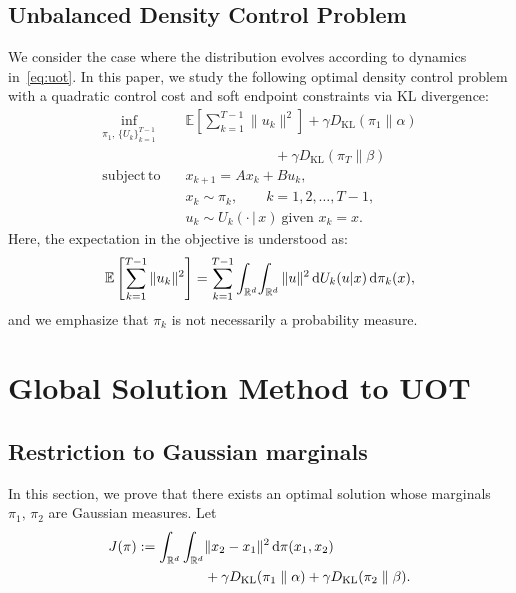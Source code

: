 \documentclass{ifacconf}
\newcommand{\R}{{\mathbb R}}
\newcommand{\exb}[1]{{\mathbb E}\left[ #1 \right]}   %
\newcommand{\rmd}{{\rm d}}
\newcommand{\Rd}{\R ^{d}}
\newcommand{\KL}[2]{D_{\mathrm{KL}}(#1 \parallel #2)}
\newcommand{\subj}{\mathrm{subject \,to}}
\begin{document}
\subsection{Unbalanced Density Control Problem}\label{subsection:udc}
 We consider the case where the distribution evolves according to dynamics in~\eqref{eq:uot}.
In this paper, we study the following optimal density control problem with a quadratic control cost and soft endpoint constraints via KL divergence:
\begin{equation}\label{eq:udc}
    \begin{aligned}
        \inf_{\pi_1,\,\{U_k\}_{k=1}^{T-1}} \quad &\exb{\sum_{k=1}^{T-1}\|u_k\|^2} + \gamma \KL{\pi_1}{\alpha} \\
        & \qquad\qquad\qquad\,\,+ \gamma \KL{\pi_T}{\beta}\\
        \subj\quad & x_{k+1} = A x_k + B u_k,\\
        & x_k \sim \pi_k,\qquad k=1,2,\ldots,T-1,\\
        & u_k \sim U_k(\cdot\,|\,x)\ \text{given } x_k=x .
    \end{aligned}
\end{equation}
Here, the expectation in the objective is understood as:
\[
\exb{\sum_{k=1}^{T-1}\|u_k\|^2} =
\sum_{k=1}^{T-1}\int_{\Rd}\!\int_{\Rd} \|u\|^2 \,\rmd U_k(u|x)\,\rmd \pi_k(x),
\]
and we emphasize that $\pi_k$ is not necessarily a probability measure.





\section{Global Solution Method to UOT}\label{section:uot-solution}

\subsection{Restriction to Gaussian marginals}
\label{subsection:uot-gaussian-restriction}

In this section, we prove that there exists an optimal solution whose marginals \(\pi_1,\,\pi_2\) are Gaussian measures.
Let
\begin{align*}
    J(\pi):= \int_{\Rd}\int_{\Rd} &\|x_2-x_1\|^2 \,\rmd \pi(x_1,x_2) \\
    &+ \gamma \KL{\pi_1}{\alpha} + \gamma \KL{\pi_2}{\beta}.
\end{align*}
\end{document}
